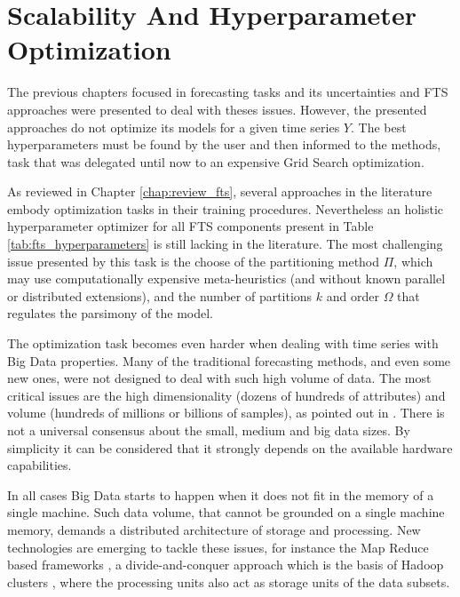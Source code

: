 \chapter{Scalability And Hyperparameter Optimization}
\label{chap:scalability}


The previous chapters focused in forecasting tasks and its uncertainties and FTS approaches were presented to deal with theses issues. However, the presented approaches do not optimize its models for a given time series $Y$. The best hyperparameters must be found by the user and then informed to the methods, task that was delegated until now to an expensive Grid Search optimization.

As reviewed in Chapter \ref{chap:review_fts}, several approaches in the literature embody optimization tasks in their training procedures. Nevertheless an holistic hyperparameter optimizer for all FTS components present in Table \ref{tab:fts_hyperparameters} is still lacking in the literature. The most challenging issue presented by this task is the choose of the partitioning method $\Pi$, which may use computationally expensive meta-heuristics (and without known parallel or distributed extensions), and the number of partitions $k$ and order $\Omega$ that regulates the parsimony of the model.

The optimization task becomes even harder when dealing with time series with Big Data properties. Many of the traditional forecasting methods, and even some new ones, were not designed to deal with such high volume of data. The most critical issues are the high dimensionality (dozens of hundreds of attributes) and volume (hundreds of millions or billions of samples), as pointed out in \cite{Qiu2016}. There is not a universal consensus about the small, medium and big data sizes. By simplicity it can be considered that it strongly depends on the available hardware capabilities. 

In all cases Big Data starts to happen when it does not fit in the memory of a single machine. Such data volume, that cannot be grounded on a single machine memory, demands a distributed architecture of storage and processing. New technologies are emerging to tackle these issues, for instance the Map Reduce based frameworks \cite{Dean2008}, a  divide-and-conquer approach which is the basis of Hadoop clusters \cite{White2012}, where the processing units also act as storage units of the data subsets. 

